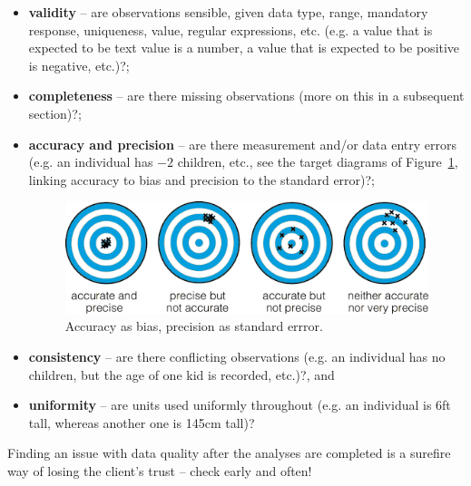 \begin{itemize}[noitemsep]
\item \textbf{validity} -- are observations sensible, given data type, range, mandatory response, uniqueness, value, regular expressions, etc. (e.g. a value that is expected to be text value is a number, a value that is expected to be positive is negative, etc.)?; 
\item \textbf{completeness} -- are there missing observations (more on this in a subsequent section)?; 
\item \textbf{accuracy and precision} -- are there measurement and/or data entry errors (e.g. an individual has $-2$ children, etc., see the target diagrams of Figure~\ref{fig:targets}, linking accuracy to bias and precision to the standard error)?; \begin{figure}[t]
\centering
\includegraphics[width=\textwidth]{Images/targets.png}
\caption{\small Accuracy as bias, precision as standard errror.} \label{fig:targets}
\end{figure}
\afterpage{\FloatBarrier}
\item 
\textbf{consistency} -- are there conflicting observations (e.g. an individual has no children, but the age of one kid is recorded, etc.)?, and 
\item \textbf{uniformity} -- are units used uniformly throughout (e.g. an individual is 6ft tall, whereas another one is 145cm tall)?\end{itemize}
Finding an issue with data quality after the analyses are completed is a surefire way of losing the client's trust -- check early and often!

